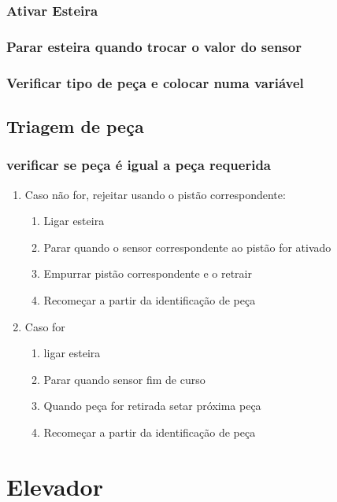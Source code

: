 \documentclass[11pt]{article}
\begin{document}
\subsubsection{Ativar Esteira}
\label{sec-1-2-2}
\subsubsection{Parar esteira quando trocar o valor do sensor}
\label{sec-1-2-3}
\subsubsection{Verificar tipo de peça e colocar numa variável}
\label{sec-1-2-4}
\subsection{Triagem de peça}
\label{sec-1-3}
\subsubsection{}
\label{sec-1-3-1}
\subsubsection{verificar se peça é igual a peça requerida}
\label{sec-1-3-2}
\begin{enumerate}
\item Caso não for, rejeitar usando o pistão correspondente:
\label{sec-1-3-2-1}
\begin{enumerate}
\item Ligar esteira
\item Parar quando o sensor correspondente ao pistão for ativado
\item Empurrar pistão correspondente e o retrair
\item Recomeçar a partir da identificação de peça
\end{enumerate}
\item Caso for
\label{sec-1-3-2-2}
\begin{enumerate}
\item ligar esteira
\item Parar quando sensor fim de curso
\item Quando peça for retirada setar próxima peça
\item Recomeçar a partir da identificação de peça
\end{enumerate}
\newpage
\end{enumerate}
\section{Elevador}
\label{sec-2}
\end{document}
